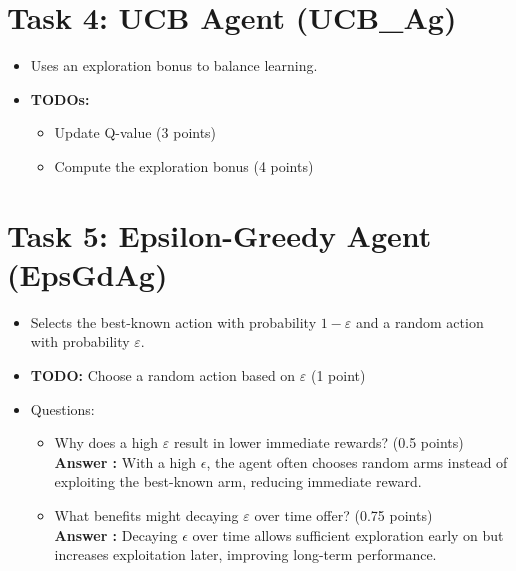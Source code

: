 \documentclass[12pt]{article}
\begin{document}
{{{\section{Task 4: UCB Agent (UCB\_Ag)}
\begin{itemize}[noitemsep]
    \item Uses an exploration bonus to balance learning.
    \item \textbf{TODOs:}
    \begin{itemize}[noitemsep]
        \item Update Q-value (3 points)
        \item Compute the exploration bonus (4 points)
    \end{itemize}
\end{itemize}

\section{Task 5: Epsilon-Greedy Agent (EpsGdAg)}
\begin{itemize}[noitemsep]
    \item Selects the best-known action with probability \(1-\varepsilon\) and a random action with probability \(\varepsilon\).
    \item \textbf{TODO:} Choose a random action based on \(\varepsilon\) (1 point)
    \item Questions:
    \begin{itemize}[noitemsep]
        \item Why does a high \(\varepsilon\) result in lower immediate rewards? (0.5 points)\\
        \textbf{Answer :} With a high $\epsilon$, the agent often chooses random arms instead of exploiting the best-known arm, reducing immediate reward.
        \item What benefits might decaying \(\varepsilon\) over time offer? (0.75 points)\\
        \textbf{Answer :} Decaying $\epsilon$ over time allows sufficient exploration early on but increases exploitation later, improving long-term performance.
    \end{itemize}
\end{itemize}

}}}
\end{document}
